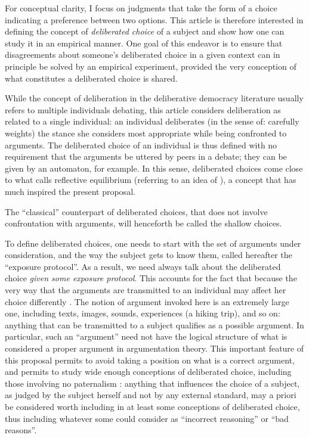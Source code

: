 \documentclass[version=last, pagesize, twoside=off, bibliography=totoc, DIV=calc, fontsize=12pt, a4paper, french, english]{scrartcl}
\begin{document}
For conceptual clarity, I focus on judgments that take the form of a choice indicating a preference between two options. 
This article is therefore interested in defining the concept of \emph{deliberated choice} of a subject and show how one can study it in an empirical manner. 
One goal of this endeavor is to ensure that disagreements about someone’s deliberated choice in a given context can in principle be solved by an empirical experiment, provided the very conception of what constitutes a deliberated choice is shared. 

While the concept of deliberation in the deliberative democracy literature usually refers to multiple individuals debating, this article considers deliberation as related to a single individual: an individual deliberates (in the sense of: carefully weights) the stance she considers most appropriate while being confronted to arguments. The deliberated choice of an individual is thus defined with no requirement that the arguments be uttered by peers in a debate; they can be given by an automaton, for example. In this sense, deliberated choices come close to what \citet{rawls_theory_1999} calls reflective equilibrium (referring to an idea of \citet{goodman_fact_1983}), a concept that has much inspired the present proposal.

The “classical” counterpart of deliberated choices, that does not involve confrontation with arguments, will henceforth be called the shallow choices.

To define deliberated choices, one needs to start with the set of arguments under consideration, and the way the subject gets to know them, called hereafter the “exposure protocol”. 
As a result, we need always talk about the deliberated choice \emph{given some exposure protocol}. 
This accounts for the fact that because the very way that the arguments are transmitted to an individual may affect her choice differently \citep{railton_facts_2003}. 
The notion of argument invoked here is an extremely large one, including texts, images, sounds, experiences (a hiking trip), and so on: anything that can be transmitted to a subject qualifies as a possible argument. In particular, such an “argument” need not have the logical structure of what is considered a proper argument in argumentation theory. This important feature of this proposal permits to avoid taking a position on what is a correct argument, and permits to study wide enough conceptions of deliberated choice, including those involving no paternalism \citep{cailloux_formal_2020}: anything that influences the choice of a subject, as judged by the subject herself and not by any external standard, may a priori be considered worth including in at least some conceptions of deliberated choice, thus including whatever some could consider as “incorrect reasoning” or “bad reasons”.
\end{document}
